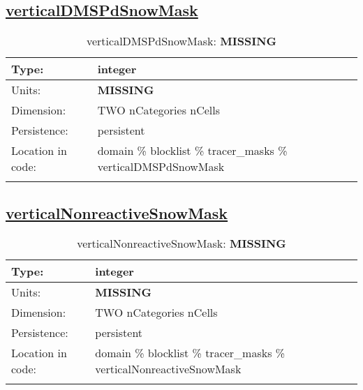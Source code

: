 \subsection[verticalDMSPdSnowMask]{\hyperref[sec:var_tab_tracer_masks]{verticalDMSPdSnowMask}}
\label{subsec:var_sec_tracer_masks_verticalDMSPdSnowMask}
\begin{center}
\begin{longtable}{| p{2.0in} | p{4.0in} |}
        \hline 
        Type: & integer \\
        \hline 
        Units: & {\bf \color{red} MISSING} \\
        \hline 
        Dimension: & TWO nCategories nCells \\
        \hline 
        Persistence: & persistent \\
        \hline 
         Location in code: & domain \% blocklist \% tracer\_masks \% verticalDMSPdSnowMask \\
         \hline 
    \caption{verticalDMSPdSnowMask: {\bf \color{red} MISSING}}
\end{longtable}
\end{center}
\subsection[verticalNonreactiveSnowMask]{\hyperref[sec:var_tab_tracer_masks]{verticalNonreactiveSnowMask}}
\label{subsec:var_sec_tracer_masks_verticalNonreactiveSnowMask}
\begin{center}
\begin{longtable}{| p{2.0in} | p{4.0in} |}
        \hline 
        Type: & integer \\
        \hline 
        Units: & {\bf \color{red} MISSING} \\
        \hline 
        Dimension: & TWO nCategories nCells \\
        \hline 
        Persistence: & persistent \\
        \hline 
         Location in code: & domain \% blocklist \% tracer\_masks \% verticalNonreactiveSnowMask \\
         \hline 
    \caption{verticalNonreactiveSnowMask: {\bf \color{red} MISSING}}
\end{longtable}
\end{center}
